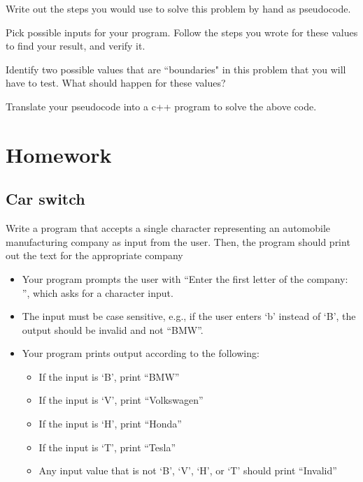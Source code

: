 \newpage

\begin{multipart}
    Write out the steps you would use to solve this problem by hand as pseudocode. 
\end{multipart}

\vspace{10cm}

\begin{multipart}
    Pick possible inputs for your program. Follow the steps you wrote for these values to find your result, and verify it.
\end{multipart}

\vspace{3.5cm}

\begin{multipart}
     Identify two possible values that are ``boundaries" in this problem that you will have to test. What should happen for these values?
\end{multipart}

\vspace{3.5cm}

\begin{multipart}
    Translate your pseudocode into a c++ program to solve the above code.
\end{multipart}


\section{Homework}

\subsection{Car switch}

Write a program that accepts a single character representing an automobile manufacturing company as input from the user. Then, the program should print out the text for the appropriate company

\begin{itemize}
\item Your program prompts the user with “Enter the first letter of the company: ”, which asks for a character input. 
\item The input must be case sensitive, e.g., if the user enters ‘b’ instead of ‘B’, the output should be invalid and not “BMW”.
    \item Your program prints output according to the following:
    \begin{itemize}
        \item If the input is ‘B’, print “BMW”
        \item If the input is ‘V’, print “Volkswagen”
        \item If the input is ‘H’, print “Honda”
        \item If the input is ‘T’, print “Tesla”
        \item Any input value that is not ‘B’, ‘V’, ‘H’, or ‘T’ should print “Invalid”
    \end{itemize}
\end{itemize}



